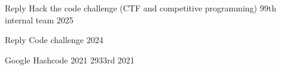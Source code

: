 
\begin{cvhonors}

\cvhonor
{Reply Hack the code challenge (CTF and competitive programming)} %
{99th internal team} %
{} %
{2025} %

\cvhonor
{Reply Code challenge} %
 {} %
{} %
{2024} %

\cvhonor
{Google Hashcode 2021} %
{2933rd} %
{} %
{2021} %


\end{cvhonors}



